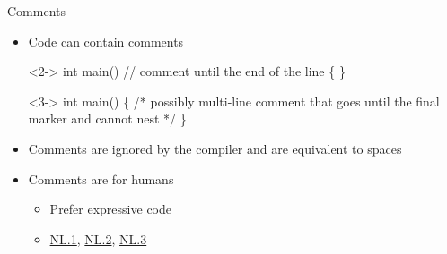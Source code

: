 \begin{frame}[fragile]{Comments}

  \begin{itemize}

  \item Code can contain comments

    \begin{codeblock}<2->{
int main() \alert{//} comment until the end of the line
\{
\}}\end{codeblock}

    \begin{codeblock}<3->{
int main()
\{
  \alert{/*} possibly multi-line comment
     that goes until the final marker
     and cannot nest \alert{*/}
\}}\end{codeblock}

  \item<4-> Comments are ignored by the compiler and are equivalent to spaces
  \item<4-> Comments are for humans
    \begin{itemize}
    \item Prefer expressive code
    \item
      \href{https://isocpp.github.io/CppCoreGuidelines/CppCoreGuidelines#nl1-dont-say-in-comments-what-can-be-clearly-stated-in-code}{NL.1},
      \href{https://isocpp.github.io/CppCoreGuidelines/CppCoreGuidelines#nl2-state-intent-in-comments}{NL.2},
      \href{https://isocpp.github.io/CppCoreGuidelines/CppCoreGuidelines#nl3-keep-comments-crisp}{NL.3}
    \end{itemize}
  \end{itemize}

\end{frame}


